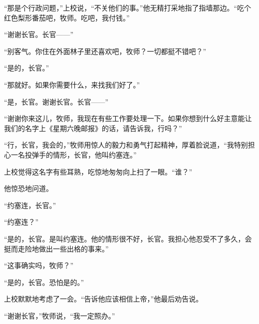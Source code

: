     “那是个行政问题，”上校说，“不关他们的事。”他无精打采地指了指墙那边。“吃个红色梨形番茄吧，牧师。吃吧，我付钱。”

    “谢谢长官。长官——”

    “别客气。你住在外面林子里还喜欢吧，牧师？一切都挺不错吧？”

    “是的，长官。”

    “那就好。如果你需要什么，来找我们好了。”

    “是，长官。谢谢长官。长官——”

    “谢谢你来这儿，牧师，我现在有些工作要处理一下。如果你想到什么好主意能让我们的名字上《星期六晚邮报》的话，请告诉我，行吗？”

    “行，长官，我会的，”牧师用惊人的毅力和勇气打起精神，厚着脸说道，“我特别担心一名投弹手的情形，长官，他叫约塞连。”

    上校觉得这名字有些耳熟，吃惊地匆匆向上扫了一眼。“谁？”

    他惊恐地问道。

    “约塞连，长官。”

    “约塞连？”

    “是的，长官。是叫约塞连。他的情形很不好，长官。我担心他忍受不了多久，会挺而走险地做出一些出格的事来。”

    “这事确实吗，牧师？”

    “是的，长官。恐怕是的。”

    上校默默地考虑了一会。“告诉他应该相信上帝，”他最后劝告说。

    “谢谢长官，”牧师说，“我一定照办。”
